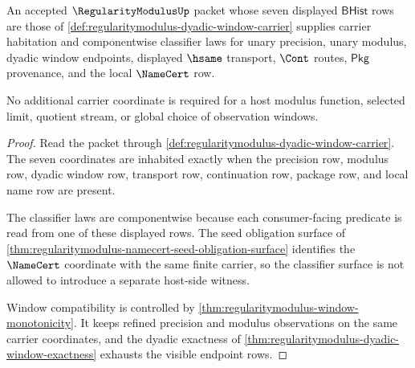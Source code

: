 \begin{theorem}
\label{thm:regularitymodulus-carrier-classifier-obligations}
An accepted $\RegularityModulusUp$ packet whose seven displayed
$\mathsf{BHist}$ rows are those of
\autoref{def:regularitymodulus-dyadic-window-carrier} supplies carrier
habitation and componentwise classifier laws for unary precision, unary
modulus, dyadic window endpoints, displayed $\hsame$ transport, $\Cont$
routes, $\mathsf{Pkg}$ provenance, and the local $\NameCert$ row.

No additional carrier coordinate is required for a host modulus function,
selected limit, quotient stream, or global choice of observation windows.
\end{theorem}
\begin{proof}
Read the packet through
\autoref{def:regularitymodulus-dyadic-window-carrier}. The seven coordinates
are inhabited exactly when the precision row, modulus row, dyadic window row,
transport row, continuation row, package row, and local name row are present.

The classifier laws are componentwise because each consumer-facing predicate
is read from one of these displayed rows. The seed obligation surface of
\autoref{thm:regularitymodulus-namecert-seed-obligation-surface} identifies
the $\NameCert$ coordinate with the same finite carrier, so the classifier
surface is not allowed to introduce a separate host-side witness.

Window compatibility is controlled by
\autoref{thm:regularitymodulus-window-monotonicity}. It keeps refined
precision and modulus observations on the same carrier coordinates, and the
dyadic exactness of
\autoref{thm:regularitymodulus-dyadic-window-exactness} exhausts the visible
endpoint rows.
\end{proof}

